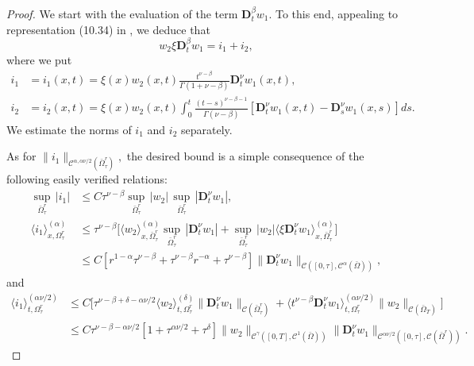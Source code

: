 \documentclass[reqno]{amsart}
\def\C {\mathcal{C}}
\theoremstyle{definition}
\numberwithin{equation}{section}
\begin{document}
\begin{proof}
We start with the evaluation of the term $\mathbf{D}_{t}^{\beta}w_1$. To this end, appealing to representation (10.34) in \cite{KPSV1}, we deduce that
\[
w_2\xi\mathbf{D}_{t}^{\beta}w_1=i_1+i_2,
\]
where we put
\begin{align*}
i_1&=i_1(x,t)=\xi(x)w_{2}(x,t)\frac{{t}^{\nu-\beta}}{\Gamma(1+
\nu-\beta)}\mathbf{D}_{t}^{\nu} w_1(x,t),\\
i_2&=i_2(x,t)=\xi(x)w_{2}(x,t)\int_{0}^{t}\frac{(t-s)^{\nu-\beta-1}}{\Gamma(\nu-\beta)}[\mathbf{D}_{t}^{\nu}w_{1}(x,t)-\mathbf{D}_{s}^{\nu}w_{1}(x,s)]ds.
\end{align*}
We estimate the norms of  $i_1$ and $i_2$ separately.

\smallskip
\noindent
As for $\|i_1\|_{\C^{\alpha,\alpha\nu/2}(\bar{\Omega}^{r}_{\tau})},$ the desired bound is a simple consequence of the following easily verified relations:
\begin{align*}
\underset{\bar{\Omega}^{r}_{\tau}}{\sup}\, |i_1|&\leq C\tau^{\nu-\beta}\underset{\bar{\Omega}^{r}_{\tau}}{\sup}\,|w_2|\,
\underset{\bar{\Omega}^{r}_{\tau}}{\sup}\,|\mathbf{D}_{t}^{\nu}w_{1}|,\\
\langle i_1\rangle_{x,\Omega^{r}_{\tau}}^{(\alpha)}&\leq\tau^{\nu-\beta}\Big[ \langle w_2\rangle_{x,\bar{\Omega}^{r}_{\tau}}^{(\alpha)}
\underset{\bar{\Omega}^{r}_{\tau}}{\sup}\,|\mathbf{D}_{t}^{\nu}w_{1}|
+\underset{\bar{\Omega}^{r}_{\tau}}{\sup}\,|w_2|
\langle \xi \mathbf{D}_{t}^{\nu}w_{1}\rangle_{x,\bar{\Omega}^{r}_{\tau}}^{(\alpha)}\Big]\\
&
\leq C[r^{1-\alpha}\tau^{\nu-\beta}+\tau^{\nu-\beta}r^{-\alpha}+\tau^{\nu-\beta}]\|\mathbf{D}_{t}^{\nu}w_{1}\|_{\C([0,\tau],\C^{\alpha}(\bar{\Omega}))},
\end{align*}
and
\begin{align*}
\langle i_1\rangle_{t,\Omega^{r}_{\tau}}^{(\alpha\nu/2)}&\leq C\Big[\tau^{\nu-\beta+\delta-\alpha\nu/2}\langle w_2\rangle_{t,\Omega^{r}_{\tau}}^{(\delta)}\|\mathbf{D}_{t}^{\nu}w_1\|_{\C(\bar{\Omega}_{\tau}^{r})}
+
\langle t^{\nu-\beta} \mathbf{D}_{t}^{\nu}w_1\rangle_{t,\Omega^{r}_{\tau}}^{(\alpha\nu/2)}\|w_2\|_{\C(\bar{\Omega}_{T})}\Big]\\
&
\leq
C\tau^{\nu-\beta-\alpha\nu/2}[1+\tau^{\alpha\nu/2}+\tau^{\delta}]\|w_2\|_{\C^{\gamma}([0,T],\C^{1}(\bar{\Omega}))}
\|\mathbf{D}_{t}^{\nu}w_1\|_{\C^{\alpha\nu/2}([0,\tau],\C(\bar{\Omega}^{r}))}.
\end{align*}


\end{proof}
\end{document}

